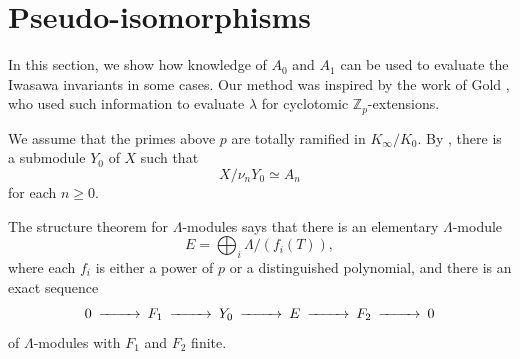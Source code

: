 \documentclass{amsart}
\begin{document}
\section{Pseudo-isomorphisms}\label{Pseudo}

In this section, we show how knowledge of $A_0$ and $A_1$ can be used to evaluate the Iwasawa invariants
in some cases. Our method was inspired by the work of Gold \cite{Gold}, who used such information
to evaluate $\lambda$ for cyclotomic $\mathbb Z_p$-extensions.

We assume that the primes above $p$ are totally ramified in $K_{\infty}/K_0$.
By \cite[Lemma 13.15]{W}, there is a submodule $Y_0$ of $X$ such that
$$
X/\nu_n Y_0 \simeq A_n
$$
for each $n\ge 0$.

The structure theorem for $\Lambda$-modules says that there is an elementary $\Lambda$-module
$$
E=\bigoplus_i \Lambda/(f_i(T)),
$$
where each $f_i$ is either a power of $p$ or a distinguished polynomial, and there is an exact sequence
$$
\begin{CD}
0@>>> F_1  @>>> Y_0 @>>> E @>>> F_2 @>>>0
\end{CD}
$$
of $\Lambda$-modules with $F_1$ and $F_2$ finite.
\end{document}
